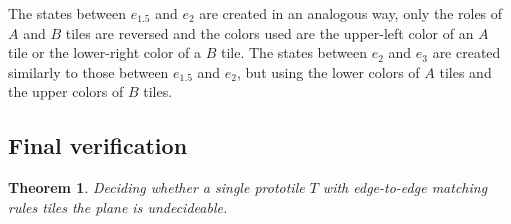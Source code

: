 \documentclass[11pt]{article}
\theoremstyle{plain}
\newtheorem{theorem}{Theorem}
\theoremstyle{definition}
\begin{document}
The states between $e_{1.5}$ and $e_{2}$ are created in an analogous way, only the roles of $A$ and $B$ tiles are reversed and the colors used are the upper-left color of an $A$ tile or the lower-right color of a $B$ tile. The states between $e_2$ and $e_3$ are created similarly to those between $e_{1.5}$ and $e_2$, but using the lower colors of $A$ tiles and the upper colors of $B$ tiles.

\subsection{Final verification}

\begin{theorem}
Deciding whether a single prototile $T$ with edge-to-edge matching rules tiles the plane is undecideable. 
\end{theorem}
\end{document}
